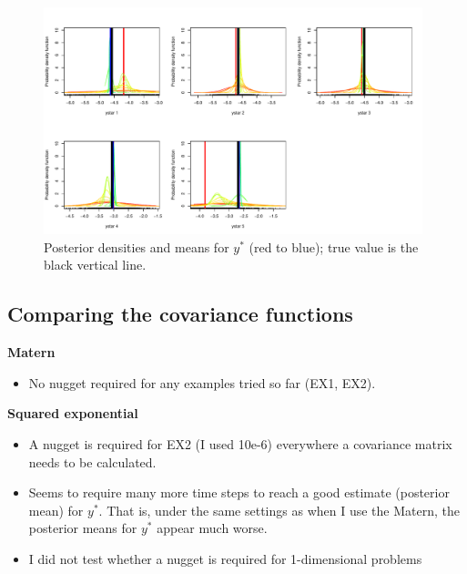 \documentclass{sfuthesis}
\begin{document}
\begin{figure}[H]
  \begin{center}
    \includegraphics[width=0.98\textwidth]{ex2ystar.pdf}
    \vspace{0.1mm}
    \caption{Posterior densities and means for $y^*$ (red to blue); true value is the black vertical line.}
    \label{ex2ystar}
  \end{center}
\end{figure}


\subsection{Comparing the covariance functions}

\textbf{Matern}
\begin{itemize}
\item No nugget required for any examples tried so far (EX1, EX2).
\end{itemize}

\textbf{Squared exponential}
\begin{itemize}
\item A nugget is required for EX2 (I used 10e-6) everywhere a covariance matrix needs to be calculated. 
\item Seems to require many more time steps to reach a good estimate (posterior mean) for $y^*$. That is, under the same settings as when I use the Matern, the posterior means for $y^*$ appear much worse.  
\item I did not test whether a nugget is required for 1-dimensional problems
\end{itemize}
\end{document}
